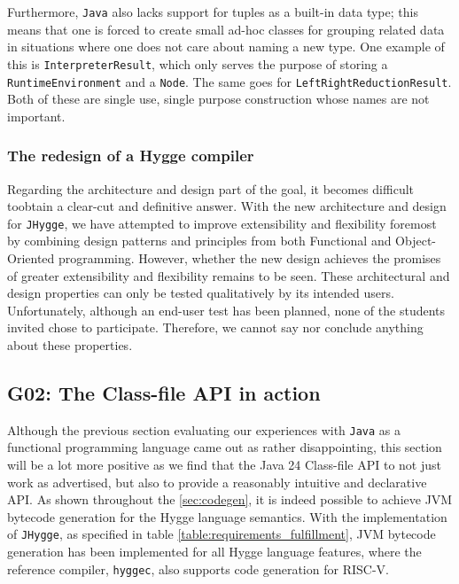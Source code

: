 Furthermore, \texttt{Java} also lacks support for tuples as a built-in data type; this means that one is forced to create small ad-hoc
classes for grouping related data in situations where one does not care about naming a new type. One example of this is \texttt{InterpreterResult},
which only serves the purpose of storing a \texttt{RuntimeEnvironment} and a \texttt{Node}. The same goes for \texttt{LeftRightReductionResult}.
Both of these are single use, single purpose construction whose names are not important.

\subsubsection{The redesign of a Hygge compiler}

Regarding the architecture and design part of the goal, it becomes difficult toobtain a clear-cut and definitive answer.
With the new architecture and design for \texttt{JHygge}, we have attempted to improve extensibility and flexibility foremost by combining design patterns
and principles from both Functional and Object-Oriented programming. However, whether the new design achieves the promises of greater extensibility
and flexibility remains to be seen. These architectural and design properties can only be tested qualitatively by its intended users. Unfortunately, although
an end-user test has been planned, none of the students invited chose to participate. Therefore, we cannot say nor conclude anything about these properties.

\subsection{\textbf{G02}: The Class-file API in action}

Although the previous section evaluating our experiences with \texttt{Java} as a functional programming language came out as rather disappointing,
this section will be a lot more positive as we find that the Java 24 Class-file API\cite{jep484} to not just work as advertised, but also to provide a
reasonably intuitive and declarative API. As shown throughout the \ref{sec:codegen},
it is indeed possible to achieve JVM bytecode generation for the Hygge language semantics. With the implementation of \texttt{JHygge},
as specified in table \ref{table:requirements_fulfillment}, JVM bytecode generation has been implemented for all Hygge language features, where the reference compiler, \texttt{hyggec},
also supports code generation for RISC-V.

